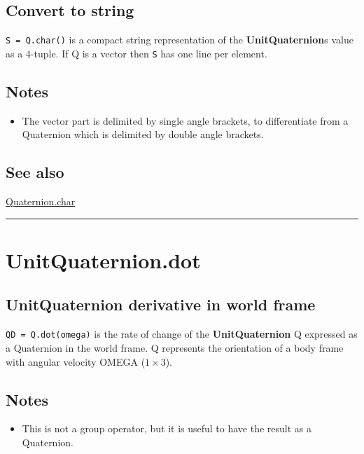 \subsection*{Convert to string}


\texttt{S = Q.char()} is a compact string representation of the \textbf{\color{red} UnitQuaternion}\textquotesingle s value
as a 4-tuple.  If Q is a vector then \texttt{S} has one line per element.


\subsection*{Notes}
\begin{itemize}
  \item The vector part is delimited by single angle brackets, to differentiate    from a Quaternion which is delimited by double angle brackets.
\end{itemize}

\subsection*{See also}


\hyperlink{Quaternion.char}{\color{blue} Quaternion.char}

\vspace{1.5ex}\hrule

\hypertarget{UnitQuaternion.dot}{\section*{UnitQuaternion.dot}}
\subsection*{UnitQuaternion derivative in world frame}


\texttt{QD = Q.dot(omega)} is the rate of change of the \textbf{\color{red} UnitQuaternion} Q expressed
as a Quaternion in the world frame. Q represents the orientation of a body
frame with angular velocity OMEGA ($1 \times 3$).


\subsection*{Notes}
\begin{itemize}
  \item This is not a group operator, but it is useful to have the result as a    Quaternion.
\end{itemize}

